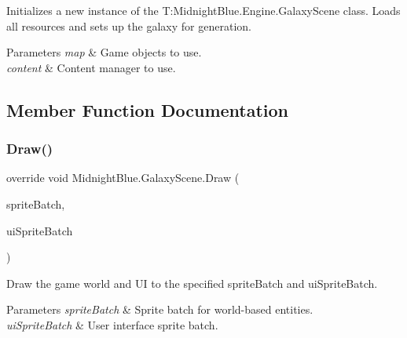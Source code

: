 Initializes a new instance of the T\+:\+Midnight\+Blue.\+Engine.\+Galaxy\+Scene class. Loads all resources and sets up the galaxy for generation. 


\begin{DoxyParams}{Parameters}
{\em map} & Game objects to use.\\
\hline
{\em content} & Content manager to use.\\
\hline
\end{DoxyParams}


\subsection{Member Function Documentation}
\hypertarget{class_midnight_blue_1_1_galaxy_scene_a3646fcf97e067bac267d42aad66e71c4}{}\label{class_midnight_blue_1_1_galaxy_scene_a3646fcf97e067bac267d42aad66e71c4} 
\subsubsection{\texorpdfstring{Draw()}{Draw()}}
{\footnotesize\ttfamily override void Midnight\+Blue.\+Galaxy\+Scene.\+Draw (\begin{DoxyParamCaption}\item[{Sprite\+Batch}]{sprite\+Batch,  }\item[{Sprite\+Batch}]{ui\+Sprite\+Batch }\end{DoxyParamCaption})\hspace{0.3cm}{\ttfamily [inline]}}



Draw the game world and UI to the specified sprite\+Batch and ui\+Sprite\+Batch. 


\begin{DoxyParams}{Parameters}
{\em sprite\+Batch} & Sprite batch for world-\/based entities.\\
\hline
{\em ui\+Sprite\+Batch} & User interface sprite batch.\\
\hline
\end{DoxyParams}
\hypertarget{class_midnight_blue_1_1_galaxy_scene_a7a96978e050da997330bcc0f3cd00f9e}{}\label{class_midnight_blue_1_1_galaxy_scene_a7a96978e050da997330bcc0f3cd00f9e} 
